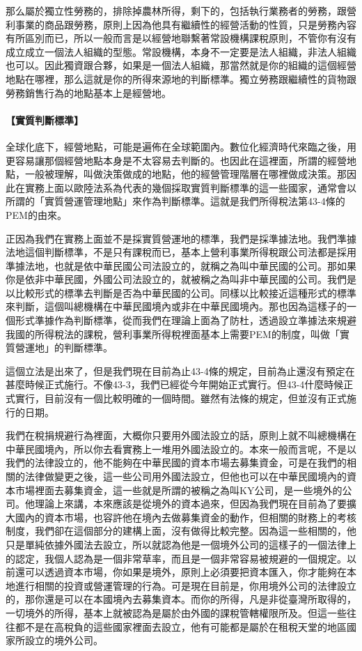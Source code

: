 \documentclass[oneside,sub3section]{ctexbook}
\let\oldparagraph\paragraph
\renewcommand{\paragraph}[1]{\oldparagraph{#1}\mbox{}}
\begin{document}
那么屬於獨立性勞務的，排除掉農林所得，剩下的，包括執行業務者的勞務，跟營利事業的商品跟勞務，原則上因為他具有繼續性的經營活動的性質，只是勞務內容有所區別而已，所以一般而言是以經營地聯繫著常設機構課稅原則，不管你有沒有成立成立一個法人組織的型態。常設機構，本身不一定要是法人組織，非法人組織也可以。因此獨資跟合夥，如果是一個法人組織，那當然就是你的組織的這個經營地點在哪裡，那么這就是你的所得來源地的判斷標準。獨立勞務跟繼續性的貨物跟勞務銷售行為的地點基本上是經營地。

\hypertarget{ux5be6ux8ceaux5224ux65b7ux6a19ux6e96}{%
\paragraph{【實質判斷標準】}\label{ux5be6ux8ceaux5224ux65b7ux6a19ux6e96}}

全球化底下，經營地點，可能是遍佈在全球範圍內。數位化經濟時代來臨之後，用更容易讓那個經營地點本身是不太容易去判斷的。也因此在這裡面，所謂的經營地點，一般被理解，叫做決策做成的地點，他的經營管理階層在哪裡做成決策。那因此在實務上面以歐陸法系為代表的幾個採取實質判斷標準的這一些國家，通常會以所謂的「實質營運管理地點」來作為判斷標準。這就是我們所得稅法第43-4條的PEM的由來。

正因為我們在實務上面並不是採實質營運地的標準，我們是採準據法地。我們準據法地這個判斷標準，不是只有課稅而已，基本上營利事業所得稅跟公司法都是採用準據法地，也就是依中華民國公司法設立的，就稱之為叫中華民國的公司。那如果你是依非中華民國，外國公司法設立的，就被稱之為叫非中華民國的公司。我們是以比較形式的標準去判斷是否為中華民國的公司。同樣以比較接近這種形式的標準來判斷，這個叫總機構在中華民國境內或非在中華民國境內。那也因為這樣子的一個形式準據作為判斷標準，從而我們在理論上面為了防杜，透過設立準據法來規避我國的所得稅法的課稅，營利事業所得稅裡面基本上需要PEM的制度，叫做「實質營運地」的判斷標準。

這個立法是出來了，但是我們現在目前為止43-4條的規定，目前為止還沒有預定在甚麼時候正式施行。不像43-3，我們已經從今年開始正式實行。但43-4什麼時候正式實行，目前沒有一個比較明確的一個時間。雖然有法條的規定，但並沒有正式施行的日期。

我們在稅捐規避行為裡面，大概你只要用外國法設立的話，原則上就不叫總機構在中華民國境內，所以你去看實務上一堆用外國法設立的。本來一般而言呢，不是以我們的法律設立的，他不能夠在中華民國的資本市場去募集資金，可是在我們的相關的法律做變更之後，這一些公司用外國法設立，但他也可以在中華民國境內的資本市場裡面去募集資金，這一些就是所謂的被稱之為叫KY公司，是一些境外的公司。他理論上來講，本來應該是從境外的資本過來，但因為我們現在目前為了要擴大國內的資本市場，也容許他在境內去做募集資金的動作，但相關的財務上的考核制度，我們卻在這個部分的建構上面，沒有做得比較完整。因為這一些相關的，他只是單純依據外國法去設立，所以就認為他是一個境外公司的這樣子的一個法律上的認定，我個人認為是一個非常草率，而且是一個非常容易被規避的一個規定。以前還可以透過資本市場，你如果是境外，原則上必須要把資本匯入，你才能夠在本地進行相關的投資或營運管理的行為。可是現在目前是，你用境外公司的法律設立的，那你還是可以在本國境內去募集資本。而你的所得，凡是非從臺灣所取得的，一切境外的所得，基本上就被認為是屬於由外國的課稅管轄權限所及。但這一些往往都不是在高稅負的這些國家裡面去設立，他有可能都是屬於在租稅天堂的地區國家所設立的境外公司。
\end{document}
